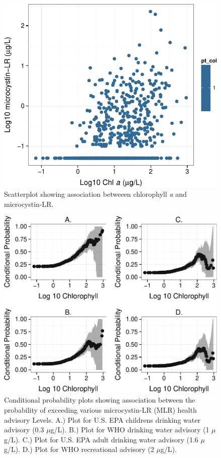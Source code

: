 \documentclass[11pt,]{article}
\begin{document}
\begin{figure}[htbp]
\centering
\includegraphics{manuscript_files/figure-latex/chla_micro_scatter-1.pdf}
\caption{Scatterplot showing association betweeen chlorophyll \textit{a}
and microcystin-LR. \label{fig:chla_micro_scatter}}
\end{figure}

\newpage

\begin{figure}[htbp]
\centering
\includegraphics{manuscript_files/figure-latex/epa_child_cp_plot-1.pdf}
\caption{Conditional probability plots showing association between the
probability of exceeding various microcystin-LR (MLR) health advisory
Levels. A.) Plot for U.S. EPA childrens drinking water advisory (0.3
\(\mu\)g/L). B.) Plot for WHO drinking water advisory (1 \(\mu\)g/L).
C.) Plot for U.S. EPA adult drinking water advisory (1.6 \(\mu\)g/L).
D.) Plot for WHO recreational advisory (2 \(\mu\)g/L).
\label{fig:multi_cp_plot}}
\end{figure}
\end{document}
